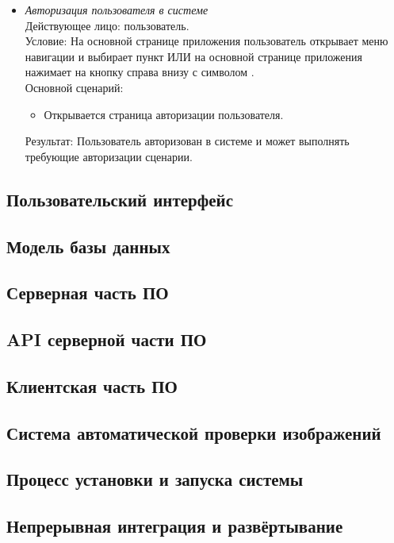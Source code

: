 \begin{itemize}[topsep=0pt, parsep=0pt, itemsep=0pt, wide=0.5cm]
	\item \textit{Авторизация пользователя в системе} \\
	Действующее лицо: пользователь. \\
	Условие: На основной странице приложения пользователь открывает меню навигации и выбирает пункт  ИЛИ на основной странице приложения нажимает на кнопку справа внизу с символом \textquote{+}. \\
	Основной сценарий:
	\begin{itemize}[topsep=0pt, parsep=0pt, itemsep=0pt, wide=0.5cm]
		\item Открывается страница авторизации пользователя.
	\end{itemize}
	Результат: Пользователь авторизован в системе и может выполнять требующие авторизации сценарии.
\end{itemize}

\subsection{Пользовательский интерфейс}

\subsection{Модель базы данных}

\subsection{Серверная часть ПО}

\subsection{API серверной части ПО}

\subsection{Клиентская часть ПО}

\subsection{Система автоматической проверки изображений}

\subsection{Процесс установки и запуска системы}

\subsection{Непрерывная интеграция и развёртывание}
